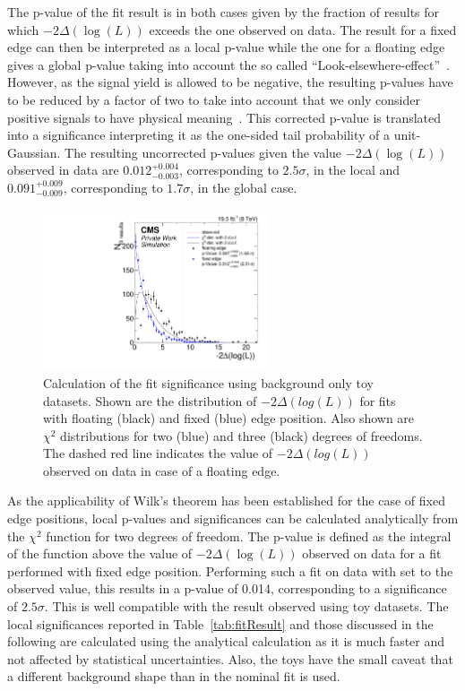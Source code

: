 The p-value of the fit result is in both cases given by the fraction of results for which  $-2\Delta\left(\log\left(L\right)\right)$ exceeds the one observed on data. The result for a fixed edge can then be interpreted as a local p-value while the one for a floating edge gives a global p-value taking into account the so called ``Look-elsewhere-effect''~\cite{GrossVittels}. However, as the signal yield is allowed to be negative, the resulting p-values have to be reduced by a factor of two to take into account that we only consider positive signals to have physical meaning~\cite{GrossVittels}. This corrected p-value is translated into a significance interpreting it as the one-sided tail probability of a unit-Gaussian. The resulting uncorrected p-values given the value  $-2\Delta\left(\log\left(L\right)\right)$ observed in data are $0.012^{+0.004}_{-0.003}$, corresponding to $2.5\sigma$, in the local and $0.091^{+0.009}_{-0.009}$, corresponding to $1.7\sigma$, in the global case.

\begin{figure}[htbp]
\centering
  \includegraphics[width=0.6\textwidth]{plots/results/fit/toyResults/significanceStudy_BackgroundOnly.pdf}
\caption{Calculation of the fit significance using background only toy datasets. Shown are the distribution of $-2\Delta(log(L))$ for fits with floating (black) and fixed (blue) edge position. Also shown are $\chi^2$ distributions for two (blue) and three (black) degrees of freedoms. The dashed red line indicates the value of $-2\Delta(log(L))$ observed on data in case of a floating edge.}
\label{fig:fit:toySignif}
\end{figure}

As the applicability of Wilk's theorem has been established for the case of fixed edge positions, local p-values and significances can be calculated analytically from the $\chi^2$ function for two degrees of freedom. The p-value is defined as the integral of the function above the value of  $-2\Delta\left(\log\left(L\right)\right)$ observed on data for a fit performed with fixed edge position. Performing such a fit on data with \mlledge set to the observed value, this results in a p-value of 0.014, corresponding to a significance of $2.5\sigma$. This is well compatible with the result observed using toy datasets. The local significances reported in Table~\ref{tab:fitResult} and those discussed in the following are calculated using the analytical calculation as it is much faster and not affected by statistical uncertainties. Also, the toys have the small caveat that a different background shape than in the nominal fit is used. 

